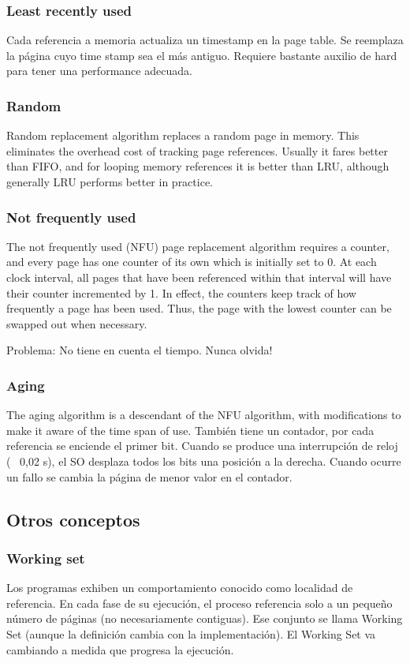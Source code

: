 \documentclass[a4paper, twoside]{article}
\begin{document}
\subsubsection{Least recently used}
Cada referencia a memoria actualiza un timestamp en la page table. Se reemplaza la página cuyo time stamp sea el más antiguo. Requiere bastante auxilio de hard para tener una performance adecuada.

\subsubsection{Random}
Random replacement algorithm replaces a random page in memory. This eliminates the overhead cost of tracking page references. Usually it fares better than FIFO, and for looping memory references it is better than LRU, although generally LRU performs better in practice.

\subsubsection{Not frequently used}
The not frequently used (NFU) page replacement algorithm requires a counter, and every page has one counter of its own which is initially set to 0. At each clock interval, all pages that have been referenced within that interval will have their counter incremented by 1. In effect, the counters keep track of how frequently a page has been used. Thus, the page with the lowest counter can be swapped out when necessary.

Problema: No tiene en cuenta el tiempo. Nunca olvida!

\subsubsection{Aging}
The aging algorithm is a descendant of the NFU algorithm, with modifications to make it aware of the time span of use. También tiene un contador, por cada referencia se enciende el primer bit. Cuando se produce una interrupción de reloj (~ 0,02 s), el SO desplaza todos los bits una posición a la derecha. Cuando ocurre un fallo se cambia la página de menor valor en el contador.

\subsection{Otros conceptos}
\subsubsection{Working set}
Los programas exhiben un comportamiento conocido como localidad de referencia. En cada fase de su ejecución, el proceso referencia solo a un pequeño número de páginas (no necesariamente contiguas). Ese conjunto se llama Working Set (aunque la definición cambia con la implementación). El Working Set va cambiando a medida que progresa la ejecución.
\end{document}

